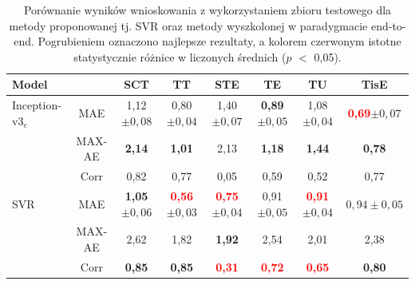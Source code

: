 \renewcommand{\arraystretch}{1.2}
\begin{table}[h]
	\caption{Porównanie wyników wnioskowania z wykorzystaniem zbioru testowego dla metody proponowanej tj. SVR oraz metody wyszkolonej w paradygmacie end-to-end. Pogrubieniem oznaczono najlepsze rezultaty, a kolorem czerwonym istotne statystycznie różnice w liczonych średnich ($p$ $<$ 0,05).}
	\scriptsize
	\begin{center}
		\begin{tabular}{lc||c|c|c|c|c|c}
			\textbf{Model} & & \textbf{SCT} & \textbf{TT} & \textbf{STE} & \textbf{TE} & \textbf{TU} & \textbf{TisE}\\ \hline \hline
			Inception-v3$_{e}$ & MAE & 1,12$\pm{0,08}$ & 0,80$\pm{0,04}$ & 1,40$\pm{0,07}$ & \textbf{0,89}$\pm{0,05}$ & 1,08$\pm{0,04}$ & \textcolor{red}{\textbf{0,69}}$\pm{0,07}$ \\
			& MAX-AE & \textbf{2,14} & \textbf{1,01} & 2,13 & \textbf{1,18} & \textbf{1,44} & \textbf{0,78} \\
			& Corr & 0,82 & 0,77 & 0,05 & 0,59 & 0,52 & 0,77 \\ \hline
			SVR & MAE & \textbf{1,05}$\pm0,06$ & \textcolor{red}{\textbf{0,56}}$\pm0,03$ & \textcolor{red}{\textbf{0,75}}$\pm0,04$ & 0,91$\pm0,05$ & \textcolor{red}{\textbf{0,91}}$\pm0,04$ & $0,94\pm0,05$\\
			& MAX-AE & 2,62 & 1,82 & \textbf{1,92} & 2,54 & 2,01 & 2,38 \\
			& Corr & \textbf{0,85} & \textbf{0,85} & \textcolor{red}{\textbf{0,31}} & \textcolor{red}{\textbf{0,72}} & \textcolor{red}{\textbf{0,65}} & \textbf{0,80} 
		\end{tabular}
	\end{center}
	\label{tab:end-to-end_testset}
\end{table}
\renewcommand{\arraystretch}{1}

